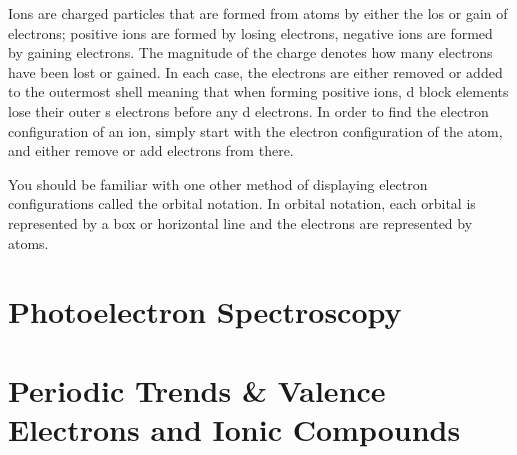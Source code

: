 \documentclass[../chem.tex]{subfiles}
\begin{document}
Ions are charged particles that are formed from atoms by either the los or gain of electrons; positive ions are formed by losing electrons, negative ions are formed by gaining electrons. The magnitude of the charge 
denotes how many electrons have been lost or gained. In each case, the electrons are either removed or added to the outermost shell meaning that when 
forming positive ions, d block elements lose their outer s electrons before any d electrons. In order to find the electron configuration of an ion, simply 
start with the electron configuration of the atom, and either remove or add electrons from there.

You should be familiar with one other method of displaying electron configurations called the orbital notation. In orbital notation, 
each orbital is represented by a box or horizontal line and the electrons are represented by atoms.
\section{Photoelectron Spectroscopy}
\section{Periodic Trends \& Valence Electrons and Ionic Compounds}
\end{document}
